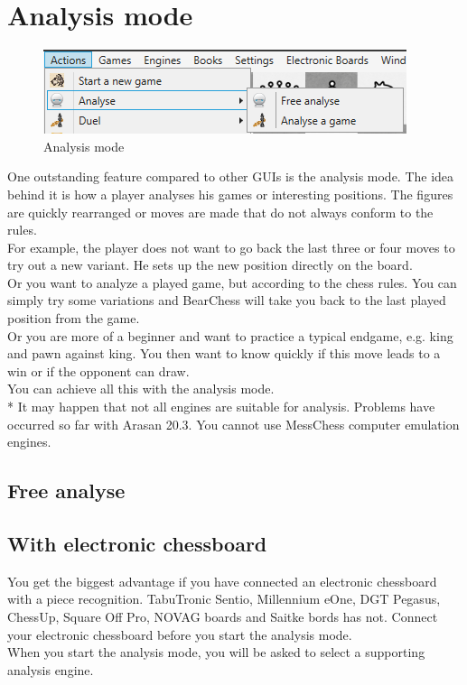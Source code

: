 \documentclass[11pt,a4paper]{article}
\begin{document}
\section{Analysis mode} \label{AnalyzeMode}


\begin{figure}[H]
	\centering
	\includegraphics[scale=1.0]{AnalyzeMode.png}
	\caption{Analysis mode}
	\label{fig:AnalyzeMode}
\end{figure}


One outstanding feature compared to other GUIs is the analysis mode. The idea behind it is how a player analyses his games or interesting positions. The figures are quickly rearranged or moves are made that do not always conform to the rules.\\
For example, the player does not want to go back the last three or four moves to try out a new variant. He sets up the new position directly on the board.\\
Or you want to analyze a played game, but according to the chess rules. You can simply try some variations and BearChess will take you back to the last played position from the game.\\
Or you are more of a beginner and want to practice a typical endgame, e.g. king and pawn against king. You then want to know quickly if this move leads to a win or if the opponent can draw.\\
You can achieve all this with the analysis mode.\\


{\color{red}*} It may happen that not all engines are suitable for analysis. Problems have occurred so far with Arasan 20.3. You cannot use MessChess computer emulation engines.

\subsection{Free analyse} \label{AnalyzeMode1}

\subsection{With electronic chessboard}

You get the biggest advantage if you have connected an electronic chessboard with a piece recognition. TabuTronic Sentio, Millennium eOne, DGT Pegasus, ChessUp, Square Off Pro, NOVAG boards and Saitke bords has not. Connect your electronic chessboard before you start the analysis mode.\\ 
When you start the analysis mode, you will be asked to select a supporting analysis engine.
\end{document}
